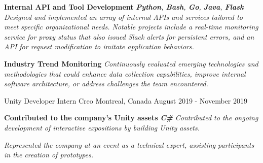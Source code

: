 \begin{cventries}
{\begin{cvitems}
{                  }
            \item {
                        \textbf{Internal API and Tool Development} \textbf{\cdotp} \textit{\textbf{Python}, \textbf{Bash}, \textbf{Go}, \textbf{Java}, \textbf{Flask}} \textbf{\cdotp} \textit{Designed and implemented an array of internal APIs and services tailored to meet specific organizational needs. Notable projects include a real-time monitoring service for proxy status that also issued Slack alerts for persistent errors, and an API for request modification to imitate application behaviors.}
                  }
            \item {
                        \textbf{Industry Trend Monitoring} \textbf{\cdotp} \textit{Continuously evaluated emerging technologies and methodologies that could enhance data collection capabilities, improve internal software architecture, or address challenges the team encountered.}
                  }
        \end{cvitems}
    }

    \cventry
    {Unity Developer Intern} %
    {Creo} %
    {Montreal, Canada} %
    {August 2019 - November 2019} %
    {
        \begin{cvitems} %
            \item {
                        \textbf{Contributed to the company's Unity assets} \textbf{\cdotp} \textit{\textbf{C\#}} \textbf{\cdotp} \textit{Contributed to the ongoing development of interactive expositions by building Unity assets.}
                  }
            \item {
                        \textit{Represented the company at an event as a technical expert, assisting participants in the creation of prototypes.}
                  }
        \end{cvitems}
    }
\end{cventries}